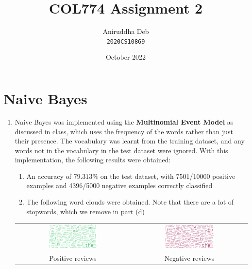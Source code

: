 \documentclass[12pt]{article}
\title{\textbf{COL774 Assignment 2}}
\author{Aniruddha Deb \\ \texttt{2020CS10869}}
\date{October 2022}
\begin{document}
\maketitle

\section{Naive Bayes}

\begin{enumerate}[label=(\alph*)]
  
    \item Naive Bayes was implemented using the \textbf{Multinomial Event Model} as discussed in class, which uses the frequency of the words rather than just their presence. The vocabulary was learnt from the training dataset, and any words not in the vocabulary in the test dataset were ignored. With this implementation, the following results were obtained:
    \begin{enumerate}
        \item An accuracy of $79.313\%$ on the test dataset, with 7501/10000 positive examples and 4396/5000 negative examples correctly classified
        \item The following word clouds were obtained. Note that there are a lot of stopwords, which we remove in part (d)
    \end{enumerate}
    \begin{center}
        \begin{tabular}{c c}
            \includegraphics[width=0.44\textwidth]{../Q1/plots/wc_pos.png} & \includegraphics[width=0.44\textwidth]{../Q1/plots/wc_neg.png} \\
            Positive reviews & Negative reviews
        \end{tabular}
    \end{center}
    

\end{enumerate}
\end{document}
